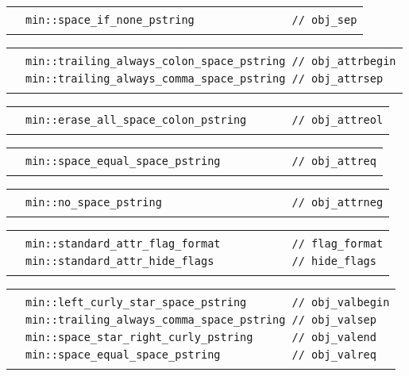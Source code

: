 \documentclass[12pt]{article}
\newenvironment{indpar}[1][0.3in]%
	{\begin{list}{}%
		     {\setlength{\itemsep}{0in}%
		      \setlength{\topsep}{0in}%
		      \setlength{\parsep}{1ex}%
		      \setlength{\labelwidth}{#1}%
		      \setlength{\leftmargin}{#1}%
		      \addtolength{\leftmargin}{\labelsep}}%
	 \item}%
	{\end{list}}
\newlength{\ARGBREAKLENGTH}
\newcommand{\ARGBREAK}[1][\ARGBREAKLENGTH]{\\&\hspace*{#1}}
\begin{document}
\begin{indpar}[1em]
\vspace{-4ex}\begin{tabular}{r@{}l}\hspace*{0.1in}\ARGBREAK
\verb|min::space_if_none_pstring               // obj_sep|\ARGBREAK
\end{tabular}

\vspace{-4ex}\begin{tabular}{r@{}l}\hspace*{0.1in}\ARGBREAK
\verb|min::trailing_always_colon_space_pstring // obj_attrbegin|\ARGBREAK
\verb|min::trailing_always_comma_space_pstring // obj_attrsep|\ARGBREAK
\end{tabular}

\vspace{-4ex}\begin{tabular}{r@{}l}\hspace*{0.1in}\ARGBREAK
\verb|min::erase_all_space_colon_pstring       // obj_attreol|\ARGBREAK[0in]
\end{tabular}

\vspace{-4ex}\begin{tabular}{r@{}l}\hspace*{0.1in}\ARGBREAK
\verb|min::space_equal_space_pstring           // obj_attreq|\ARGBREAK
\end{tabular}

\vspace{-4ex}\begin{tabular}{r@{}l}\hspace*{0.1in}\ARGBREAK
\verb|min::no_space_pstring                    // obj_attrneg|\ARGBREAK
\end{tabular}

\vspace{-4ex}\begin{tabular}{r@{}l}\hspace*{0.1in}\ARGBREAK
\verb|min::standard_attr_flag_format           // flag_format|\ARGBREAK
\verb|min::standard_attr_hide_flags            // hide_flags|\ARGBREAK
\end{tabular}

\vspace{-4ex}\begin{tabular}{r@{}l}\hspace*{0.1in}\ARGBREAK
\verb|min::left_curly_star_space_pstring       // obj_valbegin|\ARGBREAK
\verb|min::trailing_always_comma_space_pstring // obj_valsep|\ARGBREAK
\verb|min::space_star_right_curly_pstring      // obj_valend|\ARGBREAK
\verb|min::space_equal_space_pstring           // obj_valreq|\ARGBREAK
\end{tabular}

\end{indpar}
\end{document}
